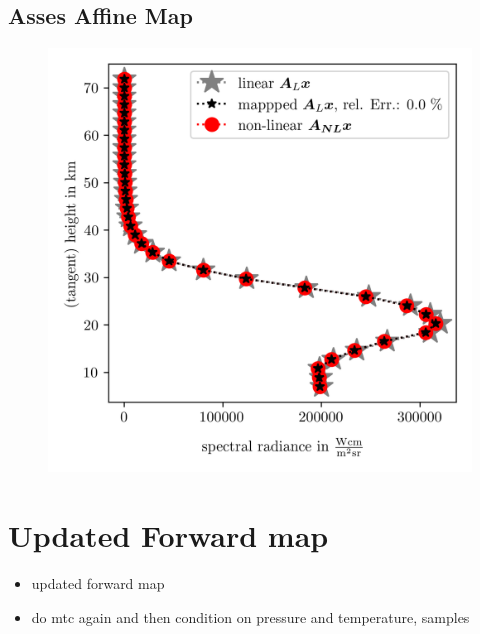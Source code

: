 \subsection{Asses Affine Map}
\begin{figure}[ht!]
	\centering
	\includegraphics{SampMapAssesment.png}
	\caption[]{}
	\label{fig:}
\end{figure}


\section{Updated Forward map}

\begin{itemize}
	\item updated forward map
		\item do mtc again and then condition on pressure and temperature, samples
\end{itemize}



